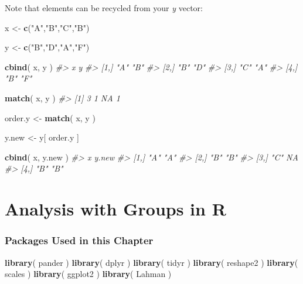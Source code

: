 \documentclass[]{book}
\newenvironment{Shaded}{\begin{snugshade}}{\end{snugshade}}
\newcommand{\CommentTok}[1]{\textcolor[rgb]{0.56,0.35,0.01}{\textit{#1}}}
\newcommand{\KeywordTok}[1]{\textcolor[rgb]{0.13,0.29,0.53}{\textbf{#1}}}
\newcommand{\NormalTok}[1]{#1}
\newcommand{\StringTok}[1]{\textcolor[rgb]{0.31,0.60,0.02}{#1}}
\theoremstyle{definition}
\theoremstyle{definition}
\theoremstyle{definition}
\theoremstyle{remark}
\begin{document}
Note that elements can be recycled from your \emph{y} vector:

\begin{Shaded}
\begin{Highlighting}[]

\NormalTok{x <-}\StringTok{ }\KeywordTok{c}\NormalTok{(}\StringTok{"A"}\NormalTok{,}\StringTok{"B"}\NormalTok{,}\StringTok{"C"}\NormalTok{,}\StringTok{"B"}\NormalTok{)}

\NormalTok{y <-}\StringTok{ }\KeywordTok{c}\NormalTok{(}\StringTok{"B"}\NormalTok{,}\StringTok{"D"}\NormalTok{,}\StringTok{"A"}\NormalTok{,}\StringTok{"F"}\NormalTok{)}

\KeywordTok{cbind}\NormalTok{( x, y )}
\CommentTok{#>      x   y  }
\CommentTok{#> [1,] "A" "B"}
\CommentTok{#> [2,] "B" "D"}
\CommentTok{#> [3,] "C" "A"}
\CommentTok{#> [4,] "B" "F"}

\KeywordTok{match}\NormalTok{( x, y )}
\CommentTok{#> [1]  3  1 NA  1}

\NormalTok{order.y <-}\StringTok{ }\KeywordTok{match}\NormalTok{( x, y )}

\NormalTok{y.new <-}\StringTok{ }\NormalTok{y[ order.y ]}

\KeywordTok{cbind}\NormalTok{( x, y.new )}
\CommentTok{#>      x   y.new}
\CommentTok{#> [1,] "A" "A"  }
\CommentTok{#> [2,] "B" "B"  }
\CommentTok{#> [3,] "C" NA   }
\CommentTok{#> [4,] "B" "B"}
\end{Highlighting}
\end{Shaded}

\hypertarget{analysis-with-groups-in-r}{%
\chapter{Analysis with Groups in R}\label{analysis-with-groups-in-r}}

\hypertarget{packages-used-in-this-chapter-1}{%
\subsection{Packages Used in this
Chapter}\label{packages-used-in-this-chapter-1}}

\begin{Shaded}
\begin{Highlighting}[]

\KeywordTok{library}\NormalTok{( pander )}
\KeywordTok{library}\NormalTok{( dplyr )}
\KeywordTok{library}\NormalTok{( tidyr )}
\KeywordTok{library}\NormalTok{( reshape2 )}
\KeywordTok{library}\NormalTok{( scales )}
\KeywordTok{library}\NormalTok{( ggplot2 )}
\KeywordTok{library}\NormalTok{( Lahman )}
\end{Highlighting}
\end{Shaded}
\end{document}

